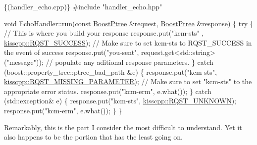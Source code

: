 \begin{DoxyCode}
\{(handler\_echo.cpp)\}
#include \textcolor{stringliteral}{"handler\_echo.hpp"}

\textcolor{keywordtype}{void} EchoHandler::run(\textcolor{keyword}{const} \hyperlink{boost__ptree_8hpp_ab36820650b8e0db36402aea80485633c}{BoostPtree} &request, \hyperlink{boost__ptree_8hpp_ab36820650b8e0db36402aea80485633c}{BoostPtree} &response)
\{
  \textcolor{keywordflow}{try} \{
    \textcolor{comment}{// This is where you build your response}
    response.put(\textcolor{stringliteral}{"kcm-sts"} , \hyperlink{namespacekisscpp_af5792fb0f68695c1a1e7a4c720d9262ea48f403b25d056ead863e1bb74664b388}{kisscpp::RQST\_SUCCESS});                \textcolor{comment}{// Make sure to
       set kcm-sts to RQST\_SUCCESS in the event of success}
    response.put(\textcolor{stringliteral}{"you-sent"}, request.get<std::string>(\textcolor{stringliteral}{"message"}));  \textcolor{comment}{// populate any aditional response
       parameters.}
  \} \textcolor{keywordflow}{catch} (boost::property\_tree::ptree\_bad\_path &e) \{
    response.put(\textcolor{stringliteral}{"kcm-sts"}, \hyperlink{namespacekisscpp_af5792fb0f68695c1a1e7a4c720d9262ea3ad7cafe8fc0329ea5edde0ebf5c807e}{kisscpp::RQST\_MISSING\_PARAMETER});       \textcolor{comment}{// Make
       sure to set "kcm-sts" to the appropriate error status.}
    response.put(\textcolor{stringliteral}{"kcm-erm"}, e.what());
  \} \textcolor{keywordflow}{catch} (std::exception& e) \{
    response.put(\textcolor{stringliteral}{"kcm-sts"}, \hyperlink{namespacekisscpp_af5792fb0f68695c1a1e7a4c720d9262ea8b54c6e47b50ce90a375d79b957f5ddb}{kisscpp::RQST\_UNKNOWN});                    
    response.put(\textcolor{stringliteral}{"kcm-erm"}, e.what());
  \}
\}
\end{DoxyCode}


Remarkably, this is the part I consider the most difficult to understand. Yet it also happens to be the portion that has the least going on. 